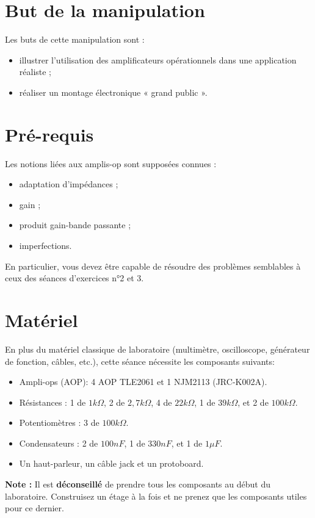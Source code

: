 \documentclass{../template/labo}
\author{The Fantastic Four}
\begin{document}

\section{But de la manipulation}

Les buts de cette manipulation sont :
\begin{itemize}
	\item illustrer l'utilisation des amplificateurs opérationnels dans une application réaliste ;
	\item réaliser un montage électronique « grand public ».
\end{itemize}

\section{Pré-requis}
Les notions liées aux amplis-op sont supposées connues :
\begin{itemize}
\item adaptation d'impédances ;
\item gain ;
\item produit gain-bande passante ;
\item imperfections.
\end{itemize}
En particulier, vous devez être capable de résoudre des problèmes semblables à ceux des séances d'exercices n°2 et 3.

\section{Matériel}
En plus du matériel classique de laboratoire (multimètre, oscilloscope, générateur de fonction, câbles, etc.), cette séance nécessite les composants suivants:
\begin{itemize}
\item Ampli-ops (AOP): 4 AOP TLE2061 et 1 NJM2113 (JRC-K002A).
\item Résistances : 1 de $1k\Omega$, 2 de $2,7k\Omega$, 4 de $22k\Omega$, 1 de $39k\Omega$, et 2 de $100k\Omega$.
\item Potentiomètres : 3 de $100k\Omega$.
\item Condensateurs : 2 de $100nF$, 1 de $330nF$, et 1 de $1\mu F$.
\item Un haut-parleur, un câble jack et un protoboard.
\end{itemize}

\textbf{Note :} Il est \textbf{déconseillé} de prendre tous les composants au début du laboratoire. Construisez un étage à la fois et ne prenez que les composants utiles pour ce dernier.
\end{document}
